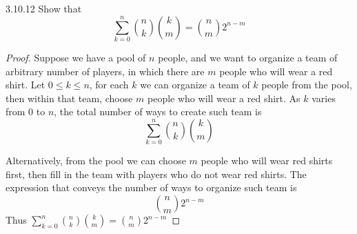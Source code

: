\documentclass{exam}
\begin{document}
\begin{problem}{3.10.12}
    Show that $$\sum_{k=0}^n\binom n k\binom k m=\binom n m 2^{n-m}$$
\end{problem}

\begin{proof}
    Suppose we have a pool of $n$ people, and we want to organize a team of arbitrary number of players, in which there are $m$ people who will wear a red shirt. Let $0 \le k \le n$, for each $k$ we can organize a team of $k$ people from the pool, then within that team, choose $m$ people who will wear a red shirt. As $k$ varies from 0 to $n$, the total number of ways to create such team is \[
        \sum_{k=0}^n\binom n k\binom k m
    \]

    Alternatively, from the pool we can choose $m$ people who will wear red shirts first, then fill in the team with players who do not wear red shirts. The expression that conveys the number of ways to organize such team is \[
        \binom n m 2^{n-m}
    \]
    Thus $\sum_{k=0}^n\binom n k\binom k m=\binom n m 2^{n-m}$
\end{proof}
\end{document}
